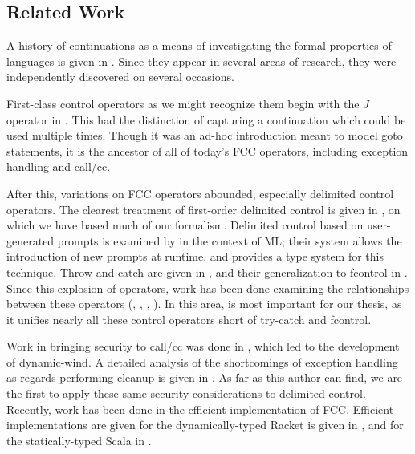 \documentclass[11pt]{article}
\begin{document}
%

\subsection{Related Work}

A history of continuations as a means of investigating the formal properties of languages is given in \cite{DiscoverContinuations}.
Since they appear in several areas of research, they were independently discovered on several occasions.

First-class control operators as we might recognize them begin with the $J$ operator in \cite{ISWIM}.
This had the distinction of capturing a continuation which could be used multiple times.
Though it was an ad-hoc introduction meant to model goto statements, it is the ancestor of all of today's FCC operators, including exception handling and call/cc.

After this, variations on FCC operators abounded, especially delimited control operators.
The clearest treatment of first-order delimited control is given in \cite{PromptApplication}, on which we have based much of our formalism.
Delimited control based on user-generated prompts is examined by \cite{Gunter:1995} in the context of ML; their system allows the introduction of new prompts at runtime, and provides a type system for this technique.
Throw and catch are given in \cite{InterpreterForScheme}, and their generalization to fcontrol in \cite{HandlingControl}.
Since this explosion of operators, work has been done examining the relationships between these operators (\cite{ControlDelimitersHierarchy}, \cite{Filinski94}, \cite{DelimDynBinding}, \cite{GreatEscape}).
In this area, \cite{MFDC} is most important for our thesis, as it unifies nearly all these control operators short of try-catch and fcontrol.

Work in bringing security to call/cc was done in \cite{continuationsInProcObjs}, which led to the development of dynamic-wind.
A detailed analysis of the shortcomings of exception handling as regards performing cleanup is given in \cite{WeimerNecula08}.
As far as this author can find, we are the first to apply these same security considerations to delimited control.
Recently, work has been done in the efficient implementation of FCC.
Efficient implementations are given for the dynamically-typed Racket is given in \cite{RacketImplFCC}, and for the statically-typed Scala in \cite{ScalaImplFCC}.
\end{document}
